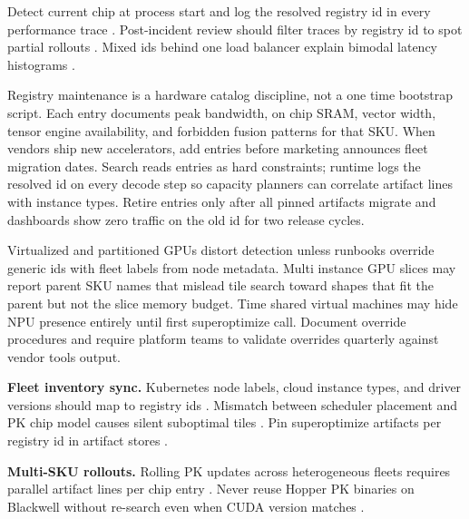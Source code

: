 Detect current chip at process start and log the resolved registry id in every performance trace \citep{yirage2026,chen2020compilerbasedhardw,patel2025llminference,dlbook}. Post-incident review should filter traces by registry id to spot partial rollouts \citep{patel2025llminference,yirage2026,chen2020compilerbasedhardw,kwon2023vllm,dlbook}. Mixed ids behind one load balancer explain bimodal latency histograms \citep{patel2025llminference,yirage2026,chen2020compilerbasedhardw,kwon2023vllm,dlbook}.

Registry maintenance is a hardware catalog discipline, not a one time bootstrap script. Each entry documents peak bandwidth, on chip SRAM, vector width, tensor engine availability, and forbidden fusion patterns for that SKU. When vendors ship new accelerators, add entries before marketing announces fleet migration dates. Search reads entries as hard constraints; runtime logs the resolved id on every decode step so capacity planners can correlate artifact lines with instance types. Retire entries only after all pinned artifacts migrate and dashboards show zero traffic on the old id for two release cycles.

Virtualized and partitioned GPUs distort detection unless runbooks override generic ids with fleet labels from node metadata. Multi instance GPU slices may report parent SKU names that mislead tile search toward shapes that fit the parent but not the slice memory budget. Time shared virtual machines may hide NPU presence entirely until first superoptimize call. Document override procedures and require platform teams to validate overrides quarterly against vendor tools output.

\textbf{Fleet inventory sync.} Kubernetes node labels, cloud instance types, and driver versions should map to registry ids \citep{patel2025llminference,yirage2026,chen2020compilerbasedhardw,kwon2023vllm,taxbreak2026,memoryfloor2026,dlbook,liu2024deepseekv3,nvidia2024cudagraphs,dao2022flashattention,semianalysis2024tma,amd2024xdna,amd2024aie,dao2023flashdecoding,nvidia2022hopper,dlbook}. Mismatch between scheduler placement and PK chip model causes silent suboptimal tiles \citep{patel2025llminference,yirage2026,chen2020compilerbasedhardw,kwon2023vllm,memoryfloor2026,taxbreak2026,dlbook}. Pin superoptimize artifacts per registry id in artifact stores \citep{yirage2026,chen2020compilerbasedhardw,patel2025llminference,taxbreak2026,memoryfloor2026,dlbook}.

\textbf{Multi-SKU rollouts.} Rolling PK updates across heterogeneous fleets requires parallel artifact lines per chip entry \citep{yirage2026,chen2020compilerbasedhardw,patel2025llminference,amd2024xdna,amd2024aie,semianalysis2024tma,taxbreak2026,memoryfloor2026,kwon2023vllm,liu2024deepseekv3,nvidia2024cudagraphs,dao2022flashattention,dao2023flashdecoding,nvidia2022hopper,dlbook}. Never reuse Hopper PK binaries on Blackwell without re-search even when CUDA version matches \citep{yirage2026,chen2020compilerbasedhardw,nvidia2022hopper,semianalysis2024tma,patel2025llminference,dlbook,taxbreak2026,memoryfloor2026,kwon2023vllm,liu2024deepseekv3,nvidia2024cudagraphs,dao2022flashattention,amd2024aie,amd2024xdna,dao2023flashdecoding,dlbook}.

